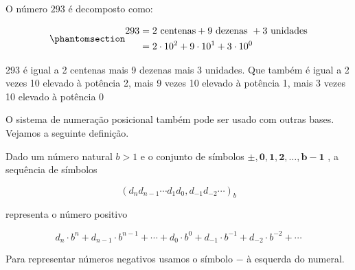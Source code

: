 \documentclass[
  a4paper,
  DIV=11,
  numbers=noendperiod,
  oneside]{scrreprt}
\begin{document}
\begin{tcolorbox}[enhanced jigsaw, breakable, left=2mm, leftrule=.75mm, title=\textcolor{quarto-callout-note-color}{\faInfo}\hspace{0.5em}{Exemplo}, opacitybacktitle=0.6, titlerule=0mm, opacityback=0, arc=.35mm, coltitle=black, colframe=quarto-callout-note-color-frame, bottomtitle=1mm, bottomrule=.15mm, rightrule=.15mm, toptitle=1mm, toprule=.15mm, colback=white, colbacktitle=quarto-callout-note-color!10!white]

O número {\(293\)} é decomposto como:

\begin{equation}\phantomsection\label{eq-exemplo-1-sistema-de-numeracao}{
\begin{split}
  293 &= 2\ \text{centenas} + 9\ \text{dezenas }+ 3\ \text{unidades}\\
  &= 2\cdot 10^2+9\cdot 10^1+3\cdot 10^0
\end{split}
}\end{equation}

293 é igual a 2 centenas mais 9 dezenas mais 3 unidades. Que também é
igual a 2 vezes 10 elevado à potência 2, mais 9 vezes 10 elevado à
potência 1, mais 3 vezes 10 elevado à potência 0

\end{tcolorbox}

O sistema de numeração posicional também pode ser usado com outras
bases. Vejamos a seguinte definição.

\begin{tcolorbox}[enhanced jigsaw, breakable, left=2mm, leftrule=.75mm, title=\textcolor{quarto-callout-tip-color}{\faLightbulb}\hspace{0.5em}{Sistema de numeração de base \(b\)}, opacitybacktitle=0.6, titlerule=0mm, opacityback=0, arc=.35mm, coltitle=black, colframe=quarto-callout-tip-color-frame, bottomtitle=1mm, bottomrule=.15mm, rightrule=.15mm, toptitle=1mm, toprule=.15mm, colback=white, colbacktitle=quarto-callout-tip-color!10!white]

Dado um número natural {\(b>1\)} e o conjunto de símbolos {
\(\pmb{\pm},  \pmb{0}, \pmb{1}, \pmb{2},\dotsc, \pmb{b-1}\) }
\footnotemark{}, a sequência de símbolos

\[
\left(d_nd_{n-1} \cdots d_1d_0,d_{-1}d_{-2} \cdots \right)_b
\]

representa o número positivo

\[
d_n\cdot b^n + d_{n-1}\cdot b^{n-1} + \cdots + d_0\cdot b^0 + d_{-1}\cdot b^{-1}+d_{-2}\cdot b^{-2} + \cdots
\]

Para representar números negativos usamos o símbolo {\(-\)} à esquerda
do numeral\footnotemark{}.

\end{tcolorbox}
\end{document}
